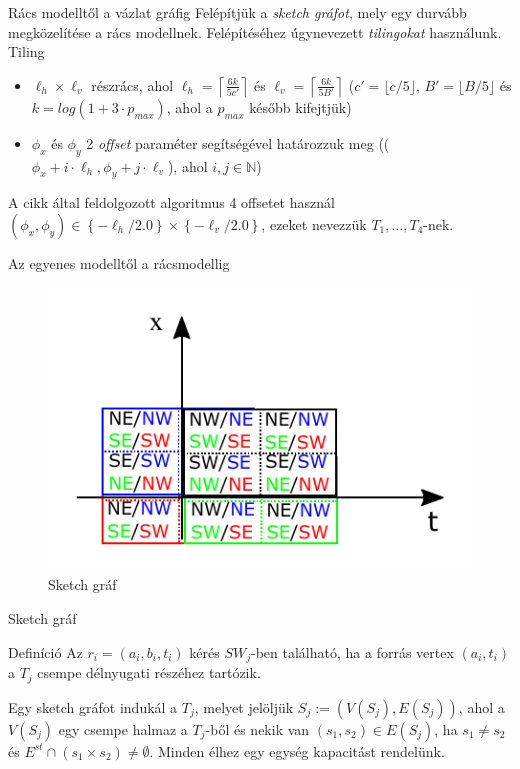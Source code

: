 \documentclass[10pt]{beamer}
\begin{document}
\begin{frame}{Rács modelltől a vázlat gráfig}
  Felépítjük a \textit{sketch gráfot}, mely egy durvább megközelítése a rács modellnek. Felépítéséhez úgynevezett \textit{tilingokat} használunk.\newline
  Tiling
  \begin{itemize}
  	\item $ \ell_h \times \ell_v $ részrács, ahol $ \ell_h = \left \lceil \frac{6k}{5c'} \right \rceil $ és $ \ell_v = \left \lceil \frac{6k}{5B'} \right \rceil $ ($ c' = \lfloor c/5 \rfloor $, $ B' = \lfloor B/5 \rfloor $ és $ k = log(1 + 3 \cdot p_{max}) $, ahol a $ p_{max} $ később kifejtjük)
  	\item $ \phi_x $ és $ \phi_y $ 2 \textit{offset} paraméter segítségével határozzuk meg (($ \phi_x + i \cdot \ell_h, \phi_y + j \cdot \ell_v $), ahol $ i,j \in \mathbb{N} $)
  \end{itemize}
  A cikk által feldolgozott algoritmus 4 offsetet használ $ (\phi_x, \phi_y) \in \left\lbrace -\ell_h/2.0 \right\rbrace \times \left\lbrace -\ell_v/2.0 \right\rbrace $, ezeket nevezzük $ T_1, \dots, T_4 $-nek.
\end{frame}

\begin{frame}{Az egyenes modelltől a rácsmodellig}
	\begin{figure}
		\centering \includegraphics[width=0.8\columnwidth]{Image/sketch_graph}
		\caption{\label{fig:sketch_graph}Sketch gráf}
	\end{figure}
\end{frame}

\begin{frame}{Sketch gráf}
  \begin{alertblock}{Definíció}
	Az $ r_i = (a_i, b_i, t_i) $ kérés $ SW_j $-ben található, ha a forrás vertex $ (a_i, t_i) $ a $ T_j $ csempe délnyugati részéhez tartózik.
  \end{alertblock}
  Egy sketch gráfot indukál a $ T_j $, melyet jelöljük $ S_j := (V(S_j), E(S_j)) $, ahol a $ V(S_j) $ egy csempe halmaz a $ T_j $-ből és nekik van $ (s_1, s_2) \in E(S_j) $, ha $ s_1 \neq s_2 $ és $ E^{st} \cap (s_1 \times s_2) \neq \emptyset $. Minden élhez egy egység kapacitást rendelünk.
\end{frame}
\end{document}
